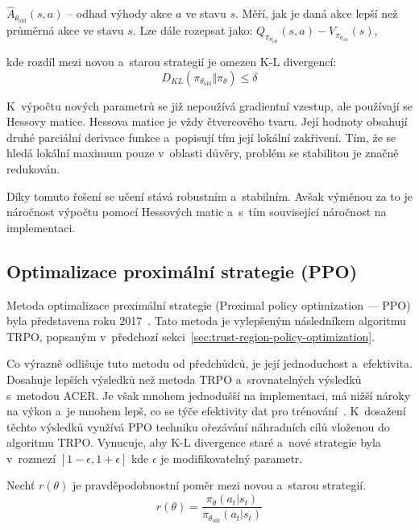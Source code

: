 \begin{myitemize}
  \item $\hat{A}_{\theta_{\text{old}}}(s, a)$ -- odhad výhody akce $a$ ve stavu $s$. Měří, jak je daná akce lepší než průměrná akce ve stavu $s$. Lze dále rozepsat jako: $Q_{\pi_{\theta_{\text{old}}}}(s, a) - V_{\pi_{\theta_{\text{old}}}}(s)$,
\end{myitemize}
kde rozdíl mezi novou a~starou strategií je omezen K-L divergencí:
\begin{equation}
  \label{eq:kl_divergence}
    D_{KL}(\pi_{\theta_{\text{old}}} \Vert \pi_{\theta}) \le \delta
\end{equation}

K~výpočtu nových parametrů se již nepoužívá gradientní vzestup, ale používají se Hessovy matice.
Hessova matice je vždy čtvercového tvaru.
Její hodnoty obsahují druhé parciální derivace funkce a~popisují tím její lokální zakřivení.
Tím, že se hledá lokální maximum pouze v~oblasti důvěry, problém se stabilitou je značně redukován.

Díky tomuto řešení se učení stává robustním a~stabilním.
Avšak výměnou za to je náročnost výpočtu pomocí Hessových matic a~s~tím související náročnost na implementaci.

\subsection{Optimalizace proximální strategie (PPO)}
\label{sec:proximalni-optimalizace-strategie}

Metoda optimalizace proximální strategie (Proximal policy optimization --- PPO) byla představena roku 2017~\cite{PPO_paper}.
Tato metoda je vylepšeným následníkem algoritmu TRPO, popsaným v~předchozí sekci~\ref{sec:trust-region-policy-optimization}.

Co výrazně odlišuje tuto metodu od předchůdců, je její jednoduchost a~efektivita.
Dosahuje lepších výsledků než metoda TRPO a~srovnatelných výsledků s~metodou ACER\@.
Je však mnohem jednodušší na implementaci, má nižší nároky na výkon a~je mnohem lepš, co se týče efektivity dat pro trénování~\cite{PPO_paper}.
K~dosažení těchto výsledků využívá PPO techniku ořezávání náhradních cílů vloženou do algoritmu TRPO\@.
Vynucuje, aby K-L divergence staré a~nové strategie byla v~rozmezí $[1-\epsilon, 1+\epsilon]$ kde $\epsilon$ je modifikovatelný parametr.

\pagebreak

Nechť $r(\theta)$ je pravděpodobnostní poměr mezi novou a~starou strategií.
\begin{equation}
  r(\theta) = \frac{\pi_\theta(a_t \vert s_t)}{\pi_{\theta_{\text{old}}}(a_t \vert s_t)}
\end{equation}

